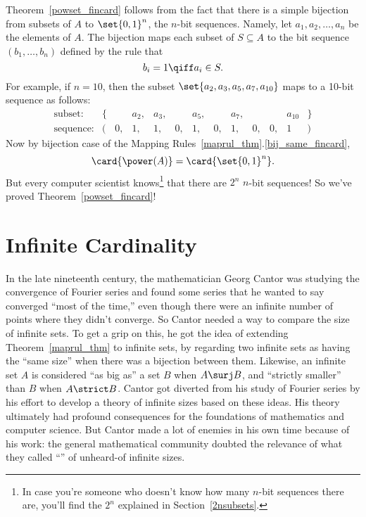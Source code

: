 Theorem~\ref{powset_fincard} follows from the fact that there is a
simple bijection from subsets of $A$ to $\set{0,1}^n$, the $n$-bit
sequences.  Namely, let $a_1, a_2, \dots, a_n$ be the elements of $A$.
The bijection maps each subset of $S \subseteq A$ to the bit sequence
$(b_1, \dots, b_n)$ defined by the rule that
\[
b_i = 1 \qiff a_i \in S.
\]
For example, if $n = 10$, then the subset $\set{a_2, a_3, a_5, a_7,
  a_{10}}$ maps to a 10-bit sequence as follows: %
\[
\begin{array}{rrrrrrrrrrrrr}
\text{subset:} & \{ & & a_2, & a_3, & & a_5, & & a_7, & & & a_{10} &
\} \\ \text{sequence:} & ( & 0, & 1, & 1, & 0, & 1, & 0, & 1, & 0, &
0, & 1 & )
\end{array}
\]
Now by bijection case of the Mapping Rules~\ref{maprul_thm}.\eqref{bij_same_fincard},
\[
\card{\power(A)} = \card{\set{0,1}^n}.
\]
But every computer scientist knows\footnote{In case you're someone who
  doesn't know how many $n$-bit sequences there are, you'll find the
  $2^n$ explained in Section~\ref{2nsubsets}.}
  that there are $2^n$ $n$-bit sequences!  So we've proved
  Theorem~\ref{powset_fincard}!

\section{Infinite Cardinality}\label{infinite_sec}

In the late nineteenth century, the mathematician Georg Cantor was
studying the convergence of Fourier series and found some series that
he wanted to say converged ``most of the time,'' even though there
were an infinite number of points where they didn't converge.  So
Cantor needed a way to compare the size of infinite sets.  To get a
grip on this, he got the idea of extending Theorem~\ref{maprul_thm} to
infinite sets, by regarding two infinite sets as having the ``same
size'' when there was a bijection between them.  Likewise, an infinite
set $A$ is considered ``as big as'' a set $B$ when $A \surj
B$, and ``strictly smaller'' than $B$ when $A \strict B$.  Cantor got
diverted from his study of Fourier series by his effort to develop a
theory of infinite sizes based on these ideas.  His theory ultimately
had profound consequences for the foundations of mathematics and
computer science.  But Cantor made a lot of enemies in his own time
because of his work: the general mathematical community doubted the
relevance of what they called ``'' of
unheard-of infinite sizes.


